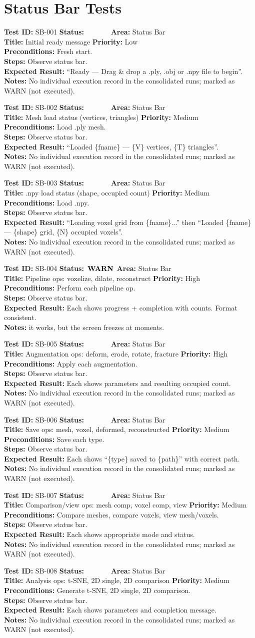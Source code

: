 \documentclass[12pt,a4paper]{article}
\newcommand{\statuspass}{\colorbox{statusgreen}{\textcolor{white}{\textbf{\,PASS\,}}}}
\newcommand{\statuswarn}{\colorbox{statusyellow}{\textcolor{black}{\textbf{\,WARN\,}}}}
\newcommand{\testcase}[9]{%
  \smallskip
  \noindent\textbf{Test ID:} #1 \hfill \textbf{Status:} #2 \hfill \textbf{Area:} #3 \\
  \textbf{Title:} #4 \hfill \textbf{Priority:} #5 \\[0.3em]
  \textbf{Preconditions:} #6 \\[0.3em]
  \textbf{Steps:} #7 \\[0.3em]
  \textbf{Expected Result:} #8 \\
  \textbf{Notes:} #9
  \smallskip
}
\begin{document}
\section{Status Bar Tests}

\testcase{SB-001}{\statuspass}{Status Bar}{Initial ready message}{Low}{Fresh start.}{Observe status bar.}{``Ready --- Drag \& drop a .ply, .obj or .npy file to begin''.}{No individual execution record in the consolidated runs; marked as WARN (not executed).}


\testcase{SB-002}{\statuspass}{Status Bar}{Mesh load status (vertices, triangles)}{Medium}{Load .ply mesh.}{Observe status bar.}{``Loaded \{fname\} --- \{V\} vertices, \{T\} triangles''.}{No individual execution record in the consolidated runs; marked as WARN (not executed).}


\testcase{SB-003}{\statuspass}{Status Bar}{.npy load status (shape, occupied count)}{Medium}{Load .npy.}{Observe status bar.}{``Loading voxel grid from \{fname\}...'' then ``Loaded \{fname\} --- \{shape\} grid, \{N\} occupied voxels''.}{No individual execution record in the consolidated runs; marked as WARN (not executed).}


\testcase{SB-004}{\statuswarn}{Status Bar}{Pipeline ops: voxelize, dilate, reconstruct}{High}{Perform each pipeline op.}{Observe status bar.}{Each shows progress + completion with counts. Format consistent.}{it works, but the screen freezes at moments.}


\testcase{SB-005}{\statuspass}{Status Bar}{Augmentation ops: deform, erode, rotate, fracture}{High}{Apply each augmentation.}{Observe status bar.}{Each shows parameters and resulting occupied count.}{No individual execution record in the consolidated runs; marked as WARN (not executed).}


\testcase{SB-006}{\statuspass}{Status Bar}{Save ops: mesh, voxel, deformed, reconstructed}{Medium}{Save each type.}{Observe status bar.}{Each shows ``\{type\} saved to \{path\}'' with correct path.}{No individual execution record in the consolidated runs; marked as WARN (not executed).}


\testcase{SB-007}{\statuspass}{Status Bar}{Comparison/view ops: mesh comp, voxel comp, view}{Medium}{Compare meshes, compare voxels, view mesh/voxels.}{Observe status bar.}{Each shows appropriate mode and status.}{No individual execution record in the consolidated runs; marked as WARN (not executed).}


\testcase{SB-008}{\statuspass}{Status Bar}{Analysis ops: t-SNE, 2D single, 2D comparison}{Medium}{Generate t-SNE, 2D single, 2D comparison.}{Observe status bar.}{Each shows parameters and completion message.}{No individual execution record in the consolidated runs; marked as WARN (not executed).}
\end{document}
